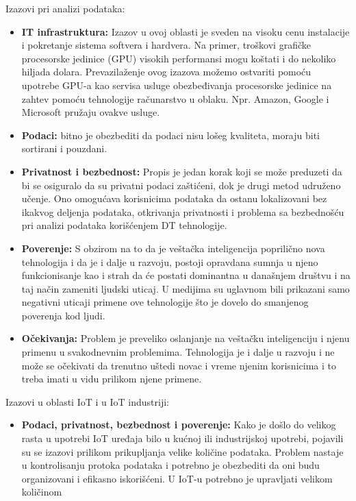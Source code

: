 \documentclass[a4paper]{article}
\begin{document}
{Izazovi pri analizi podataka:
\begin{itemize}
\item \textbf{IT infrastruktura:} Izazov u ovoj oblasti je sveden na visoku cenu instalacije i pokretanje
sistema softvera i hardvera. Na primer, troškovi grafičke procesorske jedinice (GPU) visokih
performansi mogu koštati i do nekoliko hiljada dolara. Prevazilaženje ovog izazova možemo
ostvariti pomoću upotrebe GPU-a kao servisa usluge obezbeđivanja procesorske jedinice na
zahtev pomoću tehnologije računarstvo u oblaku. Npr. Amazon, Google i Microsoft pružaju ovakve usluge. \cite{enablingtechnologies}
\item \textbf{Podaci:} bitno je obezbediti da podaci nisu lošeg kvaliteta, moraju biti sortirani i pouzdani.\cite{enablingtechnologies}
\item \textbf{Privatnost i bezbednost:} Propis je jedan korak koji se može preduzeti da bi se osiguralo da su
privatni podaci zaštićeni, dok je drugi metod udruženo učenje. Ono omogućava korisnicima
podataka da ostanu lokalizovani bez ikakvog deljenja podataka, otkrivanja privatnosti i problema
sa bezbednošću pri analizi podataka korišćenjem DT tehnologije.\cite{enablingtechnologies}
\item \textbf{Poverenje:} S obzirom na to da je veštačka inteligencija poprilično nova tehnologija i da je i
dalje u razvoju, postoji opravdana sumnja u njeno funkcionisanje kao i strah da će postati
dominantna u današnjem društvu i na taj način zameniti ljudski uticaj. U medijima su uglavnom
bili prikazani samo negativni uticaji primene ove tehnologije što je dovelo do smanjenog
poverenja kod ljudi. \cite{enablingtechnologies}
\item \textbf{Očekivanja:} Problem je preveliko oslanjanje na veštačku inteligenciju i njenu primenu u
svakodnevnim problemima. Tehnologija je i dalje u razvoju i ne može se očekivati da trenutno
uštedi novac i vreme njenim korisnicima i to treba imati u vidu prilikom njene primene.\cite{enablingtechnologies}
\end{itemize}
Izazovi u oblasti IoT i u IoT industriji:
\begin{itemize}
\item \textbf{Podaci, privatnost, bezbednost i poverenje:} Kako je došlo do velikog rasta u upotrebi IoT
uređaja bilo u kućnoj ili industrijskoj upotrebi, pojavili su se izazovi prilikom prikupljanja velike
količine podataka. Problem nastaje u kontrolisanju protoka podataka i potrebno je obezbediti da
oni budu organizovani i efikasno iskorišćeni. U IoT-u potrebno je upravljati velikom količinom

\end{itemize}}
\end{document}

